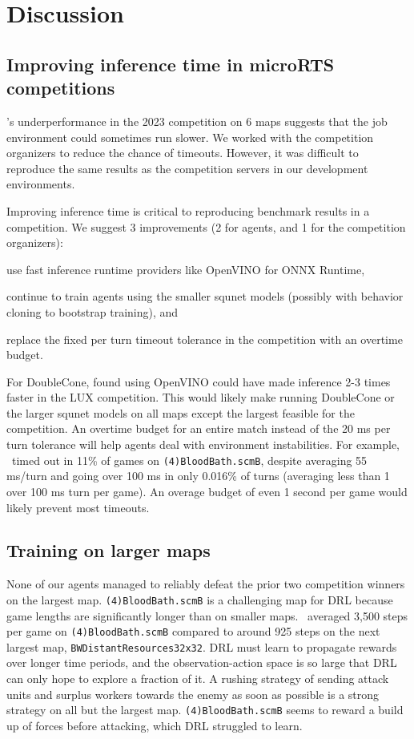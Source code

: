 \documentclass{article}
\begin{document}
\section{Discussion}
\subsection{Improving inference time in microRTS competitions}
\agentName's underperformance in the 2023 competition on 6 maps suggests that the job
environment could sometimes run slower. We worked with the competition
organizers to reduce the chance of timeouts. However, it was difficult to reproduce the same results as
the competition servers in our development environments.

Improving inference time is critical to reproducing benchmark results in a competition.
We suggest 3 improvements (2 for agents, and 1 for the competition organizers):
\begin{inparaenum}[(1)]
    \item use fast inference runtime providers like OpenVINO for ONNX Runtime,
    \item continue to train agents using the smaller squnet models (possibly with
    behavior cloning to bootstrap training), and
    \item replace the fixed per turn timeout tolerance in the competition with an overtime
    budget.
\end{inparaenum}
For DoubleCone, \citet{Ferdinand2021doublecone} found using OpenVINO could have made
inference 2-3 times faster in the LUX competition. This  would likely
make running DoubleCone or the larger squnet models on all maps except the largest
feasible for the competition. An overtime budget for an entire match instead of the 20 ms
per turn tolerance will help agents deal with environment instabilities. For example,
\bcPPOAgent\ timed out in 11\% of games on \texttt{(4)BloodBath.scmB}, despite averaging
55 ms/turn and going over 100 ms in only 0.016\% of turns (averaging less than 1 over
100 ms turn per game). An overage budget of even 1 second per game would likely prevent
most timeouts.

\subsection{Training on larger maps}
None of our agents managed to reliably defeat the prior two competition winners on 
the largest map. \texttt{(4)BloodBath.scmB} is a challenging map for DRL because game 
lengths are significantly longer than on smaller
maps. \bcPPOAgent\ averaged 3,500 steps per game on
\texttt{(4)BloodBath.scmB} compared to around 925 steps on the next largest map,
\texttt{BWDistantResources32x32}. DRL must learn to propagate rewards over longer time
periods, and the observation-action space is so large that DRL can only hope to explore a
fraction of it. A rushing strategy of sending attack units and surplus workers towards
the enemy as soon as possible is a strong strategy on all but the largest map.
\texttt{(4)BloodBath.scmB} seems to reward a build up of forces before attacking, which
DRL struggled to learn.
\end{document}
